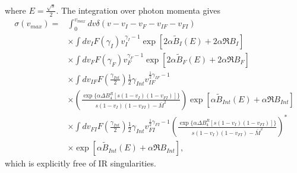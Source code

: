 where $E=\frac{\sqrt{s}}{2}$. The integration over photon momenta gives 
\begin{align}
\sigma(v_{max})=&\int_{0}^{v_{max}}dv\delta(v-v_I-v_F-v_{IF}-v_{FI})\nonumber\\
&\times\int dv_IF(\gamma_I)v_I^{\gamma_I-1}\exp[2\alpha\widetilde{B}_I(E)+2\alpha\Re B_I]\nonumber\\
&\times\int dv_FF(\gamma_F)v_F^{\gamma_F-1}\exp[2\alpha\widetilde{B}_F(E)+2\alpha\Re B_F]\nonumber\\
&\times\int dv_{IF}F\left(\frac{\gamma_{Int}}{2}\right)\frac{1}{2}\gamma_{Int}v_{IF}^{\frac{1}{2}\gamma_{IF}-1}\nonumber\\
&\times\left(\frac{\exp\{\alpha\Delta B_4^R[s(1-v_I)(1-v_{FI})]\}}{s(1-v_I)(1-v_{FI})-\bar{M}^2}\right)\exp[\alpha\widetilde{B}_{Int}(E)+\alpha\Re B_{Int}]\nonumber\\
&\times\int dv_{FI}F\left(\frac{\gamma_{Int}}{2}\right)\frac{1}{2}\gamma_{Int}v_{FI}^{\frac{1}{2}\gamma_{FI}-1}\left(\frac{\exp\{\alpha\Delta B_4^R[s(1-v_I)(1-v_{FI})]\}}{s(1-v_I)(1-v_{FI})-\bar{M}^2}\right)^\ast\nonumber\\
&\times\exp[\alpha\widetilde{B}_{Int}(E)+\alpha\Re B_{Int}],
\end{align}
which is explicitly free of IR singularities.

